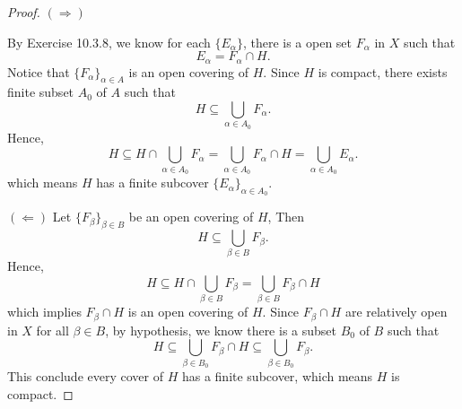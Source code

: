 \begin{Exercise}
\begin{proof}
$(\Longrightarrow)$

By Exercise 10.3.8, we know for each $\{E_{\alpha}\}$, there is a open set $F_{\alpha}$ in $X$ such that
$$
E_{\alpha} = F_{\alpha}\cap H.
$$
Notice that $\{F_{\alpha}\}_{\alpha\in A}$ is an open covering of $H$.
Since $H$ is compact, there exists finite subset $A_0$ of $A$ such that
$$
H \subseteq \bigcup_{\alpha\in A_0} F_{\alpha}.
$$
Hence,
$$
H 
\subseteq H\cap\bigcup_{\alpha\in A_0} F_{\alpha}
= \bigcup_{\alpha\in A_0} F_{\alpha} \cap H
= \bigcup_{\alpha\in A_0} E_{\alpha}.
$$
which means $H$ has a finite subcover $\{E_{\alpha}\}_{\alpha\in A_0}$.

\vspace{2ex}

$(\Longleftarrow)$
Let $\{F_{\beta}\}_{\beta\in B}$ be an open covering of $H$, Then
$$
H \subseteq \bigcup_{\beta\in B} F_{\beta}.
$$
Hence,
$$
H
\subseteq H\cap\bigcup_{\beta\in B}F_{\beta} 
= \bigcup_{\beta\in B}F_{\beta} \cap H
$$
which implies $F_{\beta} \cap H$ is an open covering of $H$. Since $F_{\beta} \cap H$ are relatively open in $X$ for all $\beta\in B$, by hypothesis, we know there is a subset $B_0$ of $B$ such that
$$
H
\subseteq \bigcup_{\beta\in B_0}F_{\beta} \cap H
\subseteq \bigcup_{\beta\in B_0}F_{\beta}.
$$
This conclude every cover of $H$ has a finite subcover, which means $H$ is compact.
\end{proof}
\end{Exercise}